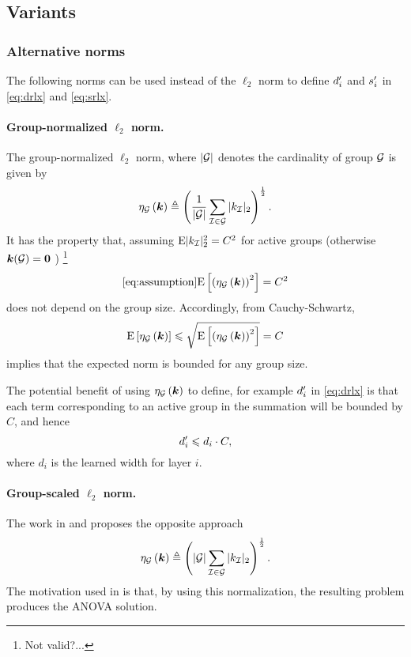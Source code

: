 \subsection{Variants}

\subsubsection{Alternative norms}

The following norms can be used instead of the $\ell_2$ norm to define $d^\prime_i$ and  $s^\prime_i$ in \eqref{eq:drlx} and \eqref{eq:srlx}. 

\paragraph{Group-normalized $\ell_2$ norm.} The group-normalized $\ell_2$ norm, where $|\mathcal{G}|$ denotes the cardinality of group $\mathcal{G}$ is given by
\begin{equation}
  \eta_{\mathcal{G}}\left(\bm{k}\right) \triangleq \left( \frac{1}{|\mathcal{G}|}\sum_{\mathcal{I} \in \mathcal{G}} | k_{\mathcal{I}} |_2 \right )^{\frac{1}{2}}.
\end{equation}
It has the property that, assuming $\textrm{E} |k_{\mathcal{I}}|_2^2 = C^2$ for active groups (otherwise $\bm{k}(\mathcal{G}) = \bm{0}$ ) \footnote{Not valid?...}
\begin{equation} \cite{eq:assumption}
  \textrm{E} \left [ \left (\eta_{\mathcal{G}}\left(\bm{k}\right) \right )^2 \right ] =  C^2
\end{equation}
does not depend on the group size. Accordingly, from Cauchy-Schwartz, 
\begin{equation}
  \textrm{E} \left [\eta_{\mathcal{G}}\left(\bm{k}\right) \right ] \leqslant   \sqrt{  \textrm{E} \left [ \left ( \eta_{\mathcal{G}}\left(\bm{k}\right) \right )^2 \right ] } = C
\end{equation}
implies that the expected norm is bounded for any group size. 

The potential benefit of using $\eta_{\mathcal{G}}\left(\bm{k}\right)$ to define, for example $d^\prime_i$ in \eqref{eq:drlx} is that each term corresponding to an active group in the summation will be bounded by $C$, and hence
\begin{equation}
d^\prime_i \leqslant d_i \cdot C,
\end{equation}
where $d_i$ is the learned width for layer $i$.

\paragraph{Group-scaled $\ell_2$ norm.}
The work in \cite{} and \cite{} proposes the opposite approach 
\begin{equation}
  \eta_{\mathcal{G}}\left(\bm{k}\right) \triangleq \left( {|\mathcal{G}|}\sum_{\mathcal{I} \in \mathcal{G}} | k_{\mathcal{I}} |_2 \right )^{\frac{1}{2}}.
\end{equation}
The motivation used in \cite{} is that, by using this normalization, the resulting problem produces the ANOVA solution.


